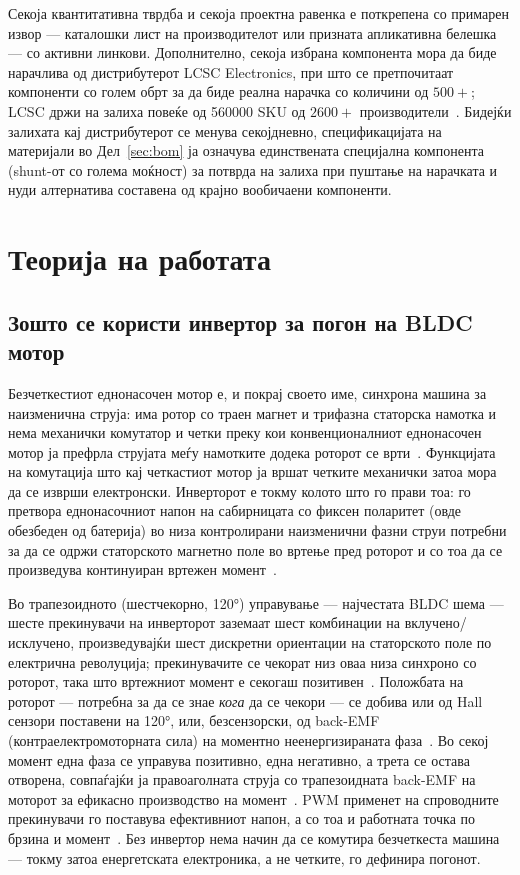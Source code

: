 \documentclass[journal,onecolumn,11pt]{IEEEtran}
\begin{document}
Секоја квантитативна тврдба и секоја проектна равенка е поткрепена со примарен
извор --- каталошки лист на производителот или призната апликативна белешка --- со
активни линкови. Дополнително, секоја избрана компонента мора да биде нарачлива од
дистрибутерот LCSC Electronics, при што се претпочитаат компоненти со голем обрт за
да биде реална нарачка со количини од \(500+\); LCSC држи на залиха повеќе од
\num{560000} SKU од \(2600+\) производители~\cite{lcschome}. Бидејќи залихата кај
дистрибутерот се менува секојдневно, спецификацијата на материјали во
Дел~\ref{sec:bom} ја означува единствената специјална компонента (shunt-от со
голема моќност) за потврда на залиха при пуштање на нарачката и нуди алтернатива
составена од крајно вообичаени компоненти.

\section{Теорија на работата}\label{sec:theory}

\subsection{Зошто се користи инвертор за погон на BLDC мотор}
Безчеткестиот еднонасочен мотор е, и покрај своето име, синхрона машина за
наизменична струја: има ротор со траен магнет и трифазна статорска намотка и нема
механички комутатор и четки преку кои конвенционалниот еднонасочен мотор ја
префрла струјата меѓу намотките додека роторот се врти~\cite{onsemi_bldc,nxp_backemf}.
Функцијата на комутација што кај четкастиот мотор ја вршат четките механички затоа
мора да се изврши електронски. Инверторот е токму колото што го прави тоа: го
претвора еднонасочниот напон на сабирницата со фиксен поларитет (овде обезбеден од
батерија) во низа контролирани наизменични фазни струи потребни за да се одржи
статорското магнетно поле во вртење пред роторот и со тоа да се произведува
континуиран вртежен момент~\cite{onsemi_bldc,nxp_backemf}.

Во трапезоидното (шестчекорно, \ang{120}) управување --- најчестата BLDC шема ---
шесте прекинувачи на инверторот заземаат шест комбинации на вклучено/исклучено,
произведувајќи шест дискретни ориентации на статорското поле по електрична
револуција; прекинувачите се чекорат низ оваа низа синхроно со роторот, така што
вртежниот момент е секогаш позитивен~\cite{onsemi_bldc}. Положбата на роторот ---
потребна за да се знае \emph{кога} да се чекори --- се добива или од Hall сензори
поставени на \ang{120}, или, безсензорски, од back-EMF (контраелектромоторната
сила) на моментно неенергизираната фаза~\cite{onsemi_bldc,nxp_backemf}. Во секој
момент една фаза се управува позитивно, една негативно, а трета се остава отворена,
совпаѓајќи ја правоаголната струја со трапезоидната back-EMF на моторот за ефикасно
производство на момент~\cite{onsemi_bldc}. PWM применет на спроводните прекинувачи
го поставува ефективниот напон, а со тоа и работната точка по брзина и момент~\cite{nxp_backemf}.
Без инвертор нема начин да се комутира безчеткеста машина --- токму затоа
енергетската електроника, а не четките, го дефинира погонот.
\end{document}

